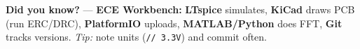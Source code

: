 \begin{tcolorbox}[
  colback=SoftYellow,
  colframe=IEEEblue!70!black,
  boxrule=0.5pt,
  arc=0mm,
  left=3mm, right=3mm, top=2.5mm, bottom=2.5mm
]
\small\RaggedRight \textbf{\color{IEEEblue!75!black}Did you know?} — \textbf{ECE Workbench:} \textbf{LTspice} simulates, \textbf{KiCad} draws PCB (run ERC/DRC), \textbf{PlatformIO} uploads, \textbf{MATLAB/Python} does FFT, \textbf{Git} tracks versions. \textit{Tip:} note units (\texttt{// 3.3V}) and commit often.
\end{tcolorbox}
